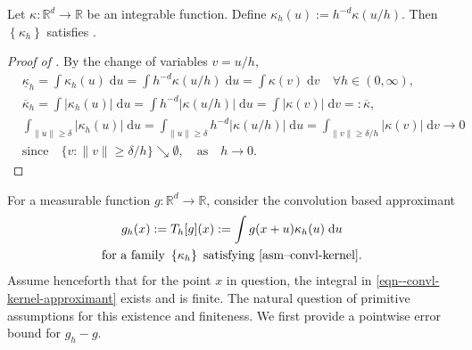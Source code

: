 \begin{lemma}
\label{lem--convl-kernel-eg}
Let \(\kappa : \mathbb{R}^{d} \to \mathbb{R}\) be an integrable function.
Define \(\kappa_{h} (u) := h^{- d} \kappa (u / h)\).
Then \(\left\{ \kappa_{h} \right\}\) satisfies .
\end{lemma}

\begin{proof}[Proof of ]
By the change of variables \(v = u / h\),
\begin{align*}
  & \underline{\kappa}_{h} = \int \kappa_{h} (u) \; \mathrm{d} u = \int h^{- d}
  \kappa (u / h) \; \mathrm{d} u = \int \kappa (v) \; \mathrm{d} v \quad \forall
  h \in (0, \infty), \\
  & \overline{\kappa}_{h} = \int \left| \kappa_{h} (u) \right| \; \mathrm{d} u =
  \int h^{- d} |\kappa (u / h)| \; \mathrm{d} u = \int |\kappa (v)| \;
  \mathrm{d} v =: \overline{\kappa},
  \\
  & \int_{\|u\| \geq \delta} \left| \kappa_{h} (u) \right| \; \mathrm{d} u =
  \int_{\|u\| \geq \delta} h^{- d} \left| \kappa (u / h) \right| \; \mathrm{d} u
  = \int_{\|v\| \geq \delta / h} |\kappa (v)| \; \mathrm{d} v \to 0 \\
  & \text{since} \quad \{v : \|v\| \geq \delta / h\} \searrow \emptyset, \quad
  \text{as} \quad h \to 0.
\end{align*}
\end{proof}

For a measurable function \(g : \mathbb{R}^{d} \to \mathbb{R}\),
consider the convolution based approximant
\begin{equation}
  \begin{gathered}
  g_{h} (x) := T_{h} [g] (x) := \int g (x + u) \kappa_{h} (u) \; \mathrm{d} u \\
  \text{for a family } \left\{ \kappa_{h} \right\} \text{ satisfying
  \Cref{asm--convl-kernel}.}
  \end{gathered}
  \label{eqn--convl-kernel-approximant}
\end{equation}
Assume henceforth that for the point \(x\) in question, the integral in
\eqref{eqn--convl-kernel-approximant} exists and is finite.
The natural question of primitive assumptions for this existence and finiteness.
We first provide a pointwise error bound for \(g_{h} - g\).

